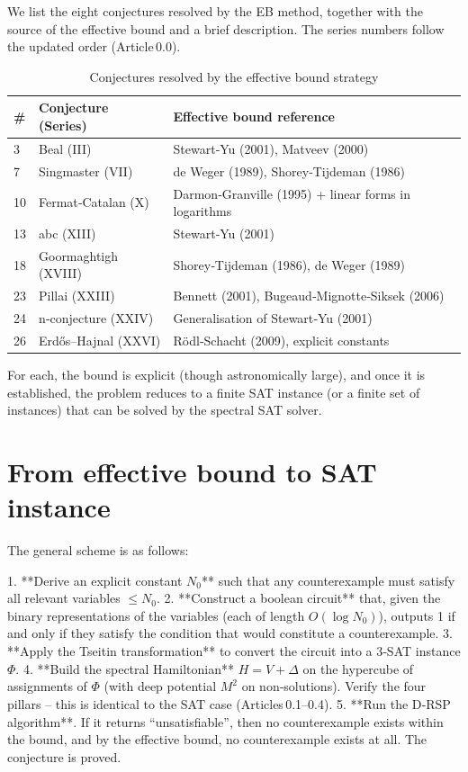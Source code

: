 \documentclass[11pt,a4paper]{article}
\begin{document}
We list the eight conjectures resolved by the EB method, together with the source of the effective bound and a brief description. The series numbers follow the updated order (Article 0.0).

\begin{longtable}{@{}llp{8cm}@{}}
\caption{Conjectures resolved by the effective bound strategy}\\
\toprule
\# & Conjecture (Series) & Effective bound reference \\
\midrule
3 & Beal (III) & Stewart‑Yu (2001), Matveev (2000) \\
7 & Singmaster (VII) & de Weger (1989), Shorey‑Tijdeman (1986) \\
10 & Fermat‑Catalan (X) & Darmon‑Granville (1995) + linear forms in logarithms \\
13 & abc (XIII) & Stewart‑Yu (2001) \\
18 & Goormaghtigh (XVIII) & Shorey‑Tijdeman (1986), de Weger (1989) \\
23 & Pillai (XXIII) & Bennett (2001), Bugeaud‑Mignotte‑Siksek (2006) \\
24 & n‑conjecture (XXIV) & Generalisation of Stewart‑Yu (2001) \\
26 & Erdős–Hajnal (XXVI) & Rödl‑Schacht (2009), explicit constants \\
\bottomrule
\end{longtable}

For each, the bound is explicit (though astronomically large), and once it is established, the problem reduces to a finite SAT instance (or a finite set of instances) that can be solved by the spectral SAT solver.

\section{From effective bound to SAT instance}

The general scheme is as follows:

1. **Derive an explicit constant \(N_0\)** such that any counterexample must satisfy all relevant variables \(\le N_0\).
2. **Construct a boolean circuit** that, given the binary representations of the variables (each of length \(O(\log N_0)\)), outputs 1 if and only if they satisfy the condition that would constitute a counterexample.
3. **Apply the Tseitin transformation** to convert the circuit into a 3‑SAT instance \(\Phi\).
4. **Build the spectral Hamiltonian** \(H = \hat{V} + \Delta\) on the hypercube of assignments of \(\Phi\) (with deep potential \(M^2\) on non‑solutions). Verify the four pillars – this is identical to the SAT case (Articles 0.1–0.4).
5. **Run the D‑RSP algorithm**. If it returns “unsatisfiable”, then no counterexample exists within the bound, and by the effective bound, no counterexample exists at all. The conjecture is proved.
\end{document}
